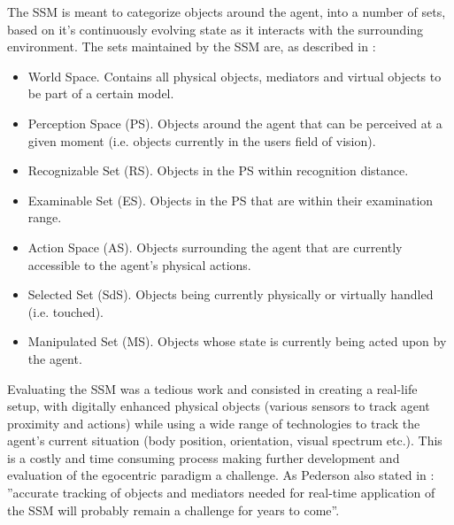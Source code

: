 The SSM is meant to categorize objects around the agent, into a number of sets, based on it's continuously evolving state as it interacts with the surrounding environment. The sets maintained by the SSM are, as described in \cite{pederson2010towards}:
\begin{itemize}
	\item World Space. Contains all physical objects, mediators and virtual objects to be part of a certain model.
	\item Perception Space (PS). Objects around the agent that can be perceived at a given moment (i.e. objects currently in the users field of vision).
	\item Recognizable Set (RS). Objects in the PS within recognition distance.
	\item Examinable Set (ES). Objects in the PS that are within their examination range.
	\item Action Space (AS). Objects surrounding the agent that are currently accessible to the agent's physical actions.
	\item Selected Set (SdS). Objects being currently physically or virtually handled (i.e. touched).
	\item Manipulated Set (MS). Objects whose state is currently being acted upon by the agent.
\end{itemize}

Evaluating the SSM was a tedious work and consisted in creating a real-life setup, with digitally enhanced physical objects (various sensors to track agent proximity and actions) while using a wide range of technologies to track the agent's current situation (body position, orientation, visual spectrum etc.). This is a costly and time consuming process making further development and evaluation of the egocentric paradigm a challenge. As Pederson also stated in \cite{pederson2011situative}: ''accurate tracking of objects and mediators needed for real-time application of the SSM will probably remain a challenge for years to come''.\\


